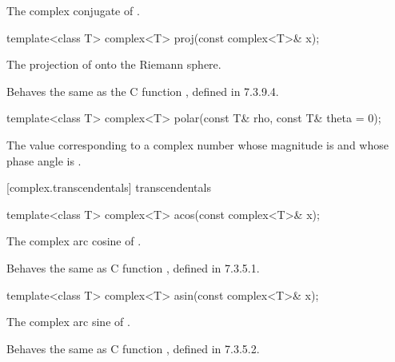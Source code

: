 \begin{itemdescr}
\pnum
\returns
The complex conjugate of .
\end{itemdescr}

%
\begin{itemdecl}
template<class T> complex<T> proj(const complex<T>& x);
\end{itemdecl}

\begin{itemdescr}
\pnum
\returns The projection of  onto the Riemann sphere.

\pnum
\remarks
Behaves the same as the C function , defined in 7.3.9.4.
\end{itemdescr}

%
\begin{itemdecl}
template<class T> complex<T> polar(const T& rho, const T& theta = 0);
\end{itemdecl}

\begin{itemdescr}
\pnum
\returns
The
value corresponding
to a complex number whose magnitude is  and whose phase angle
is .
\end{itemdescr}

[complex.transcendentals]{ transcendentals}

%
%
\begin{itemdecl}
template<class T> complex<T> acos(const complex<T>& x);
\end{itemdecl}

\begin{itemdescr}
\pnum
\returns The complex arc cosine of .

\pnum
\remarks
Behaves the same as C function ,
defined in 7.3.5.1.
\end{itemdescr}

%
%
\begin{itemdecl}
template<class T> complex<T> asin(const complex<T>& x);
\end{itemdecl}

\begin{itemdescr}
\pnum
\returns The complex arc sine of .

\pnum
\remarks
Behaves the same as C function ,
defined in 7.3.5.2.
\end{itemdescr}

